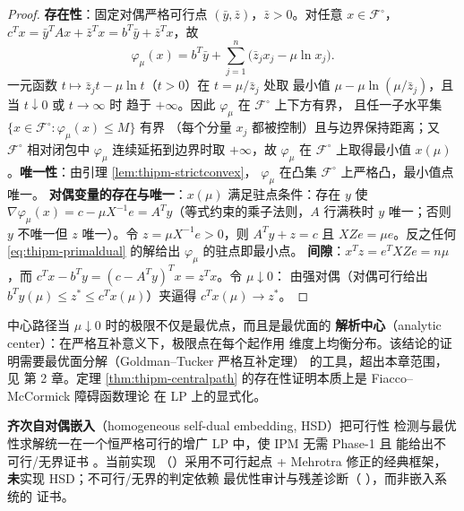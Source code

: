 \begin{proof}
\textbf{存在性}：固定对偶严格可行点 $(\bar y,\bar z)$，$\bar z>0$。对任意
$x\in\mathcal{F}^{\circ}$，
$c^{T}x=\bar y^{T}Ax+\bar z^{T}x=b^{T}\bar y+\bar z^{T}x$，故
\begin{equation*}
  \varphi_\mu(x)
  =b^{T}\bar y+\sum_{j=1}^{n}\bigl(\bar z_j x_j-\mu\ln x_j\bigr).
\end{equation*}
一元函数 $t\mapsto \bar z_j t-\mu\ln t$（$t>0$）在 $t=\mu/\bar z_j$ 处取
最小值 $\mu-\mu\ln(\mu/\bar z_j)$，且当 $t\downarrow0$ 或 $t\to\infty$ 时
趋于 $+\infty$。因此 $\varphi_\mu$ 在 $\mathcal{F}^{\circ}$ 上下方有界，
且任一子水平集 $\{x\in\mathcal{F}^{\circ}:\varphi_\mu(x)\le M\}$ 有界
（每个分量 $x_j$ 都被控制）且与边界保持距离；又
$\mathcal{F}^{\circ}$ 相对闭包中 $\varphi_\mu$ 连续延拓到边界时取
$+\infty$，故 $\varphi_\mu$ 在 $\mathcal{F}^{\circ}$ 上取得最小值
$x(\mu)$。\textbf{唯一性}：由引理 \ref{lem:thipm-strictconvex}，
$\varphi_\mu$ 在凸集 $\mathcal{F}^{\circ}$ 上严格凸，最小值点唯一。
\textbf{对偶变量的存在与唯一}：$x(\mu)$ 满足驻点条件：存在 $y$ 使
$\nabla\varphi_\mu(x)=c-\mu X^{-1}e=A^{T}y$（等式约束的乘子法则，$A$
行满秩时 $y$ 唯一；否则 $y$ 不唯一但 $z$ 唯一）。令
$z=\mu X^{-1}e>0$，则 $A^{T}y+z=c$ 且 $XZe=\mu e$。反之任何
\eqref{eq:thipm-primaldual} 的解给出 $\varphi_\mu$ 的驻点即最小点。
\textbf{间隙}：$x^{T}z=e^{T}XZe=n\mu$，而
$c^{T}x-b^{T}y=(c-A^{T}y)^{T}x=z^{T}x$。令 $\mu\downarrow0$：
由强对偶（对偶可行给出 $b^{T}y(\mu)\le z^{*}\le c^{T}x(\mu)$）夹逼得
$c^{T}x(\mu)\to z^{*}$。
\end{proof}

\begin{remark}\label{rem:thipm-analytic-center}
中心路径当 $\mu\downarrow0$ 时的极限不仅是最优点，而且是最优面的
\textbf{解析中心}（analytic center）：在严格互补意义下，极限点在每个起作用
维度上均衡分布。该结论的证明需要最优面分解（Goldman--Tucker 严格互补定理）
的工具，超出本章范围，见 \cite{ipmwright1997} 第 2 章。定理
\ref{thm:thipm-centralpath} 的存在性证明本质上是 Fiacco--McCormick
障碍函数理论 \cite{ipmfiacco1968} 在 LP 上的显式化。
\end{remark}

\begin{gapnote}
\textbf{齐次自对偶嵌入}（homogeneous self-dual embedding, HSD）把可行性
检测与最优性求解统一在一个恒严格可行的增广 LP 中，使 IPM 无需 Phase-1 且
能给出不可行/无界证书 \cite{ipmye1994,ipmandersen2000}。当前实现
（）采用不可行起点 +
Mehrotra 修正的经典框架，\textbf{未}实现 HSD；不可行/无界的判定依赖
最优性审计与残差诊断（
），而非嵌入系统的
证书。
\end{gapnote}

